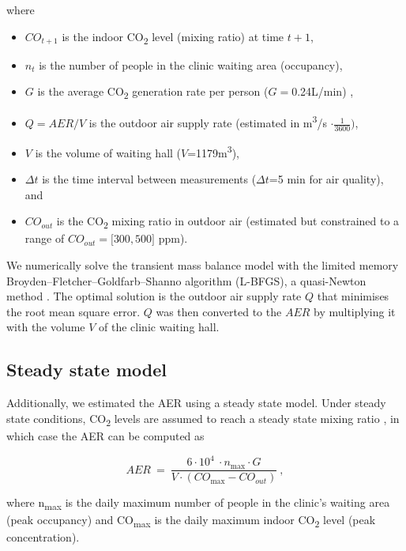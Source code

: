 \documentclass[11pt]{article}
\begin{document}
where

\begin{itemize}
\item
\(CO_{t + 1}\) is the indoor CO\textsubscript{2} level (mixing ratio) at time \(t + 1\),
\item
\(n_{t}\) is the number of people in the clinic waiting area (occupancy),
\item
\(G\) is the average CO\textsubscript{2} generation rate per person (\(G =\)0.24L/min) \cite{persily2017IndoorAir},
\item
\(Q = AER/V\) is the outdoor air supply rate (estimated in m\textsuperscript{3}/s \(\cdot \frac{1}{3600})\),
\item
\(V\) is the volume of waiting hall (\(V\)=1179m\textsuperscript{3}),
\item
\(\Delta t\) is the time interval between measurements (\(\Delta t\)=5 min for air quality), and
\item
\(CO_{out}\) is the CO\textsubscript{2} mixing ratio in outdoor air (estimated but constrained to a range of \(CO_{out} = \lbrack 300,500\rbrack\) ppm).
\end{itemize}

We numerically solve the transient mass balance model with the limited memory Broyden--Fletcher--Goldfarb--Shanno algorithm (L-BFGS), a quasi-Newton method \cite{byrd1995SIAMJSciComput}. The optimal solution is the outdoor air supply rate \(Q\) that minimises the root mean square error. \(Q\) was then converted to the \(AER\) by multiplying it with the volume \(V\) of the clinic waiting hall.

\subsection{Steady state model}\label{steady-state-model}

Additionally, we estimated the AER using a steady state model. Under steady state conditions, CO\textsubscript{2} levels are assumed to reach a steady state mixing ratio \cite{batterman2017IntJEnvResPublicHealth}, in which case the AER can be computed as

\[AER\  = \ \frac{6 \cdot 10^{4}\  \cdot n_{\max} \cdot G}{V \cdot (CO_{\max} - CO_{out})}~,\]

where n\textsubscript{max} is the daily maximum number of people in the clinic's waiting area (peak occupancy) and CO\textsubscript{max} is the daily maximum indoor CO\textsubscript{2} level (peak concentration).  
\end{document}
